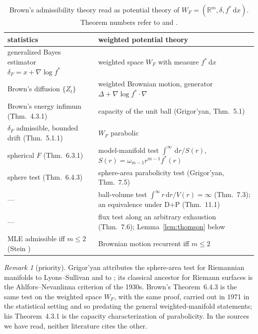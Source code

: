 \documentclass[11pt]{amsart}
\newcommand{\R}{\mathbb{R}}
\newcommand{\dd}{\,\mathrm{d}}
\theoremstyle{plain}
\theoremstyle{definition}
\theoremstyle{remark}
\newtheorem{remark}[theorem]{Remark}
\begin{document}
\begin{table}[t]
\caption{Brown's admissibility theory read as potential theory of
$W_F=(\R^m,\delta,f^*\dd x)$. Theorem numbers refer to \cite{brown1971} and
\cite{grigoryan1999}.}
\label{tab:dict}
\small
\begin{tabular}{@{}>{\raggedright\arraybackslash}p{}>{\raggedright\arraybackslash}p{}@{}}
\toprule
statistics & weighted potential theory \\
\midrule
generalized Bayes estimator $\delta_F=x+\nabla\log f^*$ & weighted space $W_F$ with measure $f^*\dd x$ \\
Brown's diffusion $\{Z_t\}$ & weighted Brownian motion, generator $\Delta+\nabla\log f^*\cdot\nabla$ \\
Brown's energy infimum (Thm.~4.3.1) & capacity of the unit ball (Grigor'yan, Thm.~5.1) \\
$\delta_F$ admissible, bounded drift (Thm.~5.1.1) & $W_F$ parabolic \\
spherical $F$ (Thm.~6.3.1) & model-manifold test $\int^\infty\dd r/S(r)$, $S(r)=\omega_{m-1}r^{m-1}f^*(r)$ \\
sphere test (Thm.~6.4.3) & sphere-area parabolicity test (Grigor'yan, Thm.~7.5) \\
--- & ball-volume test $\int^\infty r\dd r/V(r)=\infty$ (Thm.~7.3); an equivalence under D+P (Thm.~11.1) \\
--- & flux test along an arbitrary exhaustion (Thm.~7.6); Lemma~\ref{lem:thomson} below \\
MLE admissible iff $m\le2$ (Stein \cite{stein1956}) & Brownian motion recurrent iff $m\le2$ \\
\bottomrule
\end{tabular}
\end{table}

\begin{remark}[priority]\label{rem:priority}
Grigor'yan \cite[p.~178]{grigoryan1999} attributes the sphere-area test for
Riemannian manifolds to Lyons--Sullivan \cite{lyonssullivan1984} and to
\cite{grigoryan1985}; its classical ancestor for Riemann surfaces is the
Ahlfors--Nevanlinna criterion of the 1930s. Brown's Theorem~6.4.3 is the same
test on the weighted space $W_F$, with the same proof, carried out in 1971 in
the statistical setting and so predating the general weighted-manifold
statements; his Theorem~4.3.1 is the capacity characterization of parabolicity.
In the sources we have read, neither literature cites the other.
\end{remark}
\end{document}
